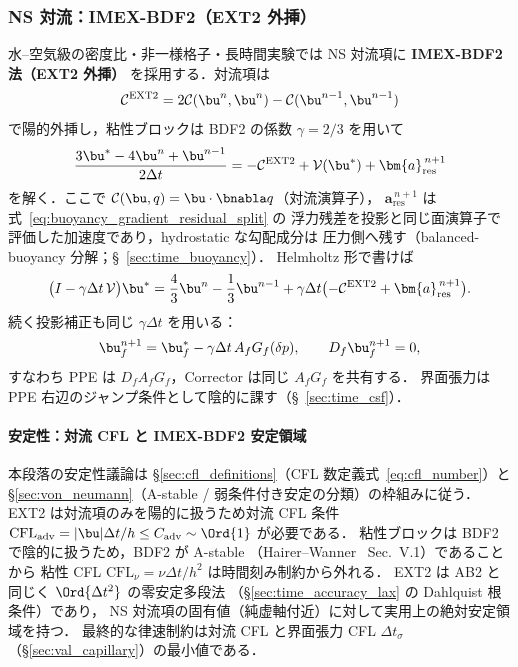 \subsubsection*{NS 対流：IMEX-BDF2（EXT2 外挿）}

水--空気級の密度比・非一様格子・長時間実験では NS 対流項に
\textbf{IMEX-BDF2 法（EXT2 外挿）} を採用する．対流項は
\[
  \mathcal{C}^{\mathrm{EXT2}}
  = 2\mathcal{C}(\bu^n,\bu^n)
    - \mathcal{C}(\bu^{n-1},\bu^{n-1})
\]
で陽的外挿し，粘性ブロックは BDF2 の係数 $\gamma=2/3$ を用いて
\begin{equation}
  \frac{3\bu^* - 4\bu^n + \bu^{n-1}}{2\Delta t}
  = -\mathcal{C}^{\mathrm{EXT2}}
    + \mathcal{V}(\bu^*)
    + \bm{a}^{\,n+1}_{\mathrm{res}}
  \label{eq:predictor_imex_bdf2}
\end{equation}
を解く．ここで $\mathcal{C}(\bu,q) = \bu\cdot\bnabla q$（対流演算子），
$\bm{a}^{\,n+1}_{\mathrm{res}}$ は式~\eqref{eq:buoyancy_gradient_residual_split} の
浮力残差を投影と同じ面演算子で評価した加速度であり，hydrostatic な勾配成分は
圧力側へ残す（balanced-buoyancy 分解；§~\ref{sec:time_buoyancy}）．
Helmholtz 形で書けば
\[
  \bigl(I-\gamma\Delta t\,\mathcal{V}\bigr)\bu^*
  =
  \frac{4}{3}\bu^n-\frac{1}{3}\bu^{n-1}
  +\gamma\Delta t\bigl(-\mathcal{C}^{\mathrm{EXT2}}
  +\bm{a}^{\,n+1}_{\mathrm{res}}\bigr).
\]
続く投影補正も同じ $\gamma\Delta t$ を用いる：
\begin{equation}
  \bu_f^{n+1}
  = \bu_f^* - \gamma\Delta t\,A_f G_f(\delta p),\qquad
  D_f\bu_f^{n+1}=0,
  \label{eq:projection_imex_bdf2_dt}
\end{equation}
すなわち PPE は $D_f A_f G_f$，Corrector は同じ $A_fG_f$ を共有する．
界面張力は PPE 右辺のジャンプ条件として陰的に課す（§~\ref{sec:time_csf}）．

\paragraph{安定性：対流 CFL と IMEX-BDF2 安定領域}
本段落の安定性議論は §\ref{sec:cfl_definitions}（CFL 数定義式~\eqref{eq:cfl_number}）と
§\ref{sec:von_neumann}（A-stable / 弱条件付き安定の分類）の枠組みに従う．
EXT2 は対流項のみを陽的に扱うため対流 CFL 条件
$\mathrm{CFL}_{\mathrm{adv}} = |\bu|\Delta t/h \le C_{\mathrm{adv}}\sim\Ord{1}$ が必要である．
粘性ブロックは BDF2 で陰的に扱うため，BDF2 が A-stable
（Hairer--Wanner~\cite{HairerWanner1996} Sec.~V.1）であることから
粘性 CFL $\mathrm{CFL}_{\nu}=\nu\Delta t/h^2$ は時間刻み制約から外れる．
EXT2 は AB2 と同じく $\Ord{\Delta t^2}$ の零安定多段法
（§\ref{sec:time_accuracy_lax} の Dahlquist 根条件）であり，
NS 対流項の固有値（純虚軸付近）に対して実用上の絶対安定領域を持つ．
最終的な律速制約は対流 CFL と界面張力 CFL $\Delta t_\sigma$
（§\ref{sec:val_capillary}）の最小値である．

